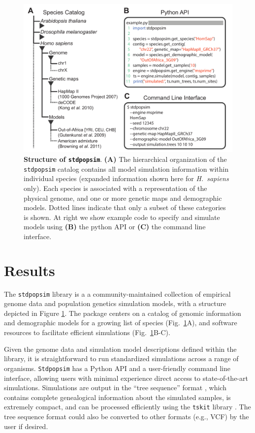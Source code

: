 \documentclass[12pt,halfline,a4paper]{ouparticle}
\newcommand{\Stdpopsim}{\texttt{Stdpopsim}\xspace}
\newcommand{\stdpopsim}{\texttt{stdpopsim}\xspace}
\newcommand{\tskit}{\texttt{tskit}\xspace}
\begin{document}
\begin{figure}[t]
\begin{center}
\includegraphics[width=0.7\linewidth]{display_items/Figure1.pdf}
    \caption{\textbf{Structure of \stdpopsim}. \textbf{(A)} The
hierarchical organization of the \stdpopsim catalog contains all model simulation information
within individual species (expanded information shown here for \textit{H.~sapiens} only).
Each species is associated with a representation of the physical genome, and one or more genetic maps and demographic models.
Dotted lines indicate that only a subset of these categories is shown.
At right we show example code to specify
and simulate models using \textbf{(B)} the python API or \textbf{(C)} the command line interface.
    }
\label{fig:cartoon}
\end{center}
\end{figure}

\section*{Results}

The \stdpopsim library is a
a community-maintained collection of empirical genome data and population genetics simulation models,
with a structure depicted in Figure \ref{fig:cartoon}.
The package centers on a catalog of genomic information and demographic models
for a growing list of species (Fig.~\ref{fig:cartoon}A),
and software resources to facilitate efficient simulations (Fig.~\ref{fig:cartoon}B-C).

Given the genome data and simulation model descriptions defined within the
library, it is straightforward to run standardized simulations
across a range of organisms. \Stdpopsim has a Python API and a user-friendly
command line interface, allowing users with minimal experience direct access to
state-of-the-art simulations. Simulations are output in the ``tree sequence''
format \citep{kelleher2016efficient,kelleher2018efficient,kelleher2019inferring}, which
contains complete genealogical information about the simulated samples, is
extremely compact, and can be processed efficiently using the \tskit library
\citep{kelleher2016efficient,kelleher2018efficient}.
The tree sequence format could also be converted
to other formats (e.g., VCF) by the user if desired.
\end{document}
